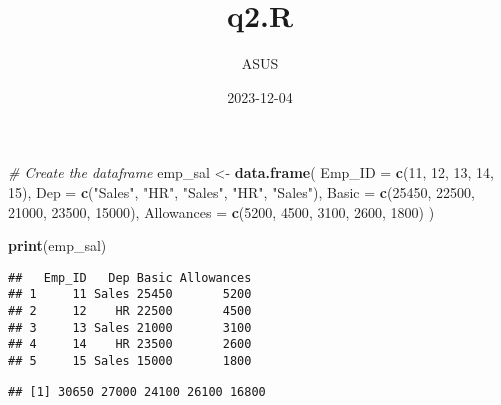 \documentclass[
]{article}
\title{q2.R}
\author{ASUS}
\date{2023-12-04}
\newenvironment{Shaded}{\begin{snugshade}}{\end{snugshade}}
\newcommand{\AttributeTok}[1]{\textcolor[rgb]{0.13,0.29,0.53}{#1}}
\newcommand{\CommentTok}[1]{\textcolor[rgb]{0.56,0.35,0.01}{\textit{#1}}}
\newcommand{\DecValTok}[1]{\textcolor[rgb]{0.00,0.00,0.81}{#1}}
\newcommand{\FunctionTok}[1]{\textcolor[rgb]{0.13,0.29,0.53}{\textbf{#1}}}
\newcommand{\NormalTok}[1]{#1}
\newcommand{\OtherTok}[1]{\textcolor[rgb]{0.56,0.35,0.01}{#1}}
\newcommand{\SpecialCharTok}[1]{\textcolor[rgb]{0.81,0.36,0.00}{\textbf{#1}}}
\newcommand{\StringTok}[1]{\textcolor[rgb]{0.31,0.60,0.02}{#1}}
\begin{document}
\maketitle

\begin{Shaded}
\begin{Highlighting}[]
\CommentTok{\# Create the dataframe}
\NormalTok{emp\_sal }\OtherTok{\textless{}{-}} \FunctionTok{data.frame}\NormalTok{(}
  \AttributeTok{Emp\_ID =} \FunctionTok{c}\NormalTok{(}\DecValTok{11}\NormalTok{, }\DecValTok{12}\NormalTok{, }\DecValTok{13}\NormalTok{, }\DecValTok{14}\NormalTok{, }\DecValTok{15}\NormalTok{),}
  \AttributeTok{Dep =} \FunctionTok{c}\NormalTok{(}\StringTok{"Sales"}\NormalTok{, }\StringTok{"HR"}\NormalTok{, }\StringTok{"Sales"}\NormalTok{, }\StringTok{"HR"}\NormalTok{, }\StringTok{"Sales"}\NormalTok{),}
  \AttributeTok{Basic =} \FunctionTok{c}\NormalTok{(}\DecValTok{25450}\NormalTok{, }\DecValTok{22500}\NormalTok{, }\DecValTok{21000}\NormalTok{, }\DecValTok{23500}\NormalTok{, }\DecValTok{15000}\NormalTok{),}
  \AttributeTok{Allowances =} \FunctionTok{c}\NormalTok{(}\DecValTok{5200}\NormalTok{, }\DecValTok{4500}\NormalTok{, }\DecValTok{3100}\NormalTok{, }\DecValTok{2600}\NormalTok{, }\DecValTok{1800}\NormalTok{)}
\NormalTok{)}

\FunctionTok{print}\NormalTok{(emp\_sal)}
\end{Highlighting}
\end{Shaded}

\begin{verbatim}
##   Emp_ID   Dep Basic Allowances
## 1     11 Sales 25450       5200
## 2     12    HR 22500       4500
## 3     13 Sales 21000       3100
## 4     14    HR 23500       2600
## 5     15 Sales 15000       1800
\end{verbatim}

\begin{Shaded}
\end{Shaded}

\begin{verbatim}
## [1] 30650 27000 24100 26100 16800
\end{verbatim}
\end{document}
